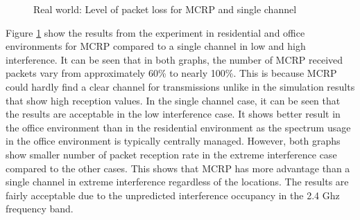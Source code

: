 
\begin{figure}
\centering
{}
\caption{Real world: Level of packet loss for MCRP and single channel}
\label{fig:hardware}
\end{figure}

Figure \ref{fig:hardware} show the results from the experiment in residential and office environments for MCRP compared to a single channel in low and high interference. It can be seen that in both graphs, the number of MCRP received packets vary from approximately 60\% to nearly 100\%. This is because MCRP could hardly find a clear channel for transmissions unlike in the simulation results that show high reception values.
In the single channel case, it can be seen that the results are acceptable in the low interference case. It shows better result in the office environment than in the residential environment as the spectrum usage in the office environment is typically centrally managed. However, both graphs show smaller number of packet reception rate in the extreme interference case compared to the other cases. This shows that MCRP has more advantage than a single channel in extreme interference regardless of the locations. The results are fairly acceptable due to the unpredicted interference occupancy in the 2.4 Ghz frequency band.



